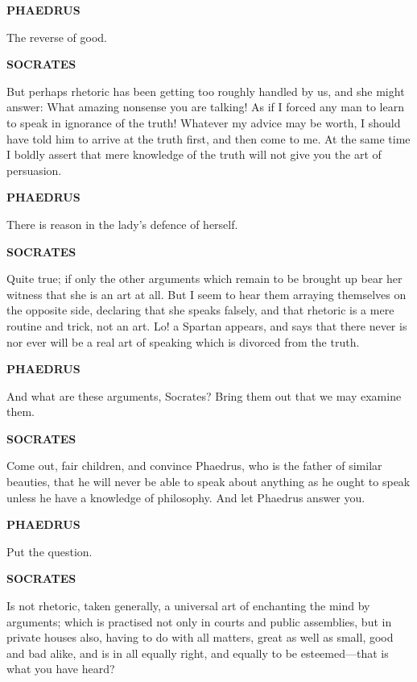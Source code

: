 \documentclass[11pt,letter]{article}
\begin{document}
\par \textbf{PHAEDRUS}
\par   The reverse of good.

\par \textbf{SOCRATES}
\par   But perhaps rhetoric has been getting too roughly handled by us, and she might answer:  What amazing nonsense you are talking! As if I forced any man to learn to speak in ignorance of the truth! Whatever my advice may be worth, I should have told him to arrive at the truth first, and then come to me. At the same time I boldly assert that mere knowledge of the truth will not give you the art of persuasion.

\par \textbf{PHAEDRUS}
\par   There is reason in the lady's defence of herself.

\par \textbf{SOCRATES}
\par   Quite true; if only the other arguments which remain to be brought up bear her witness that she is an art at all. But I seem to hear them arraying themselves on the opposite side, declaring that she speaks falsely, and that rhetoric is a mere routine and trick, not an art. Lo! a Spartan appears, and says that there never is nor ever will be a real art of speaking which is divorced from the truth.

\par \textbf{PHAEDRUS}
\par   And what are these arguments, Socrates? Bring them out that we may examine them.

\par \textbf{SOCRATES}
\par   Come out, fair children, and convince Phaedrus, who is the father of similar beauties, that he will never be able to speak about anything as he ought to speak unless he have a knowledge of philosophy. And let Phaedrus answer you.

\par \textbf{PHAEDRUS}
\par   Put the question.

\par \textbf{SOCRATES}
\par   Is not rhetoric, taken generally, a universal art of enchanting the mind by arguments; which is practised not only in courts and public assemblies, but in private houses also, having to do with all matters, great as well as small, good and bad alike, and is in all equally right, and equally to be esteemed—that is what you have heard?
\end{document}
